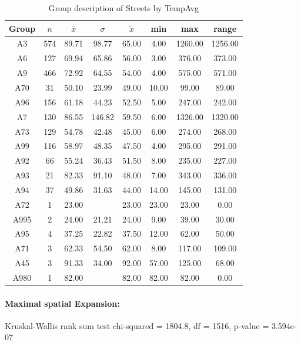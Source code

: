 \documentclass[a4paper,headsepline,footsepline,fontsize=11pt,BCOR=12mm,DIV=12]{report}
\begin{document}
\begin{table}[h]
	\small
	\centering
	\begin{tabular}{c|c|c|c|c|c|c|c}
		\toprule
		Group & $n$ & $\bar{x}$ & $\sigma$ & $\tilde{x}$ & min & max & range \\ 
		\midrule
		A3 & 574 & 89.71 & 98.77 & 65.00 & 4.00 & 1260.00 & 1256.00 \\ 
		A6 & 127 & 69.94 & 65.86 & 56.00 & 3.00 & 376.00 & 373.00 \\ 
		A9 & 466 & 72.92 & 64.55 & 54.00 & 4.00 & 575.00 & 571.00 \\ 
		A70 & 31 & 50.10 & 23.99 & 49.00 & 10.00 & 99.00 & 89.00 \\ 
		A96 & 156 & 61.18 & 44.23 & 52.50 & 5.00 & 247.00 & 242.00 \\ 
		A7 & 130 & 86.55 & 146.82 & 59.50 & 6.00 & 1326.00 & 1320.00 \\ 
		A73 & 129 & 54.78 & 42.48 & 45.00 & 6.00 & 274.00 & 268.00 \\ 
		A99 & 116 & 58.97 & 48.35 & 47.50 & 4.00 & 295.00 & 291.00 \\ 
		A92 & 66 & 55.24 & 36.43 & 51.50 & 8.00 & 235.00 & 227.00 \\ 
		A93 & 21 & 82.33 & 91.10 & 48.00 & 7.00 & 343.00 & 336.00 \\ 
		A94 & 37 & 49.86 & 31.63 & 44.00 & 14.00 & 145.00 & 131.00 \\ 
		A72 & 1 & 23.00 &  & 23.00 & 23.00 & 23.00 & 0.00 \\ 
		A995 & 2 & 24.00 & 21.21 & 24.00 & 9.00 & 39.00 & 30.00 \\ 
		A95 & 4 & 37.25 & 22.82 & 37.50 & 12.00 & 62.00 & 50.00 \\ 
		A71 & 3 & 62.33 & 54.50 & 62.00 & 8.00 & 117.00 & 109.00 \\ 
		A45 & 3 & 91.33 & 34.00 & 92.00 & 57.00 & 125.00 & 68.00 \\ 
		A980 & 1 & 82.00 &  & 82.00 & 82.00 & 82.00 & 0.00 \\ 
		  \bottomrule
	\end{tabular}
	\caption{Group description of Streets by TempAvg}
\end{table}

\paragraph{Maximal spatial Expansion:}
Kruskal-Wallis rank sum test chi-squared = 1804.8, df = 1516, p-value = 3.594e-07
\end{document}
